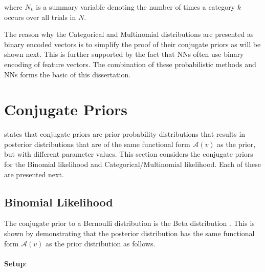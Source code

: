 where $N_{k}$ is a summary variable denoting the number of times a category $k$ occurs over all trials in $N$.

The reason why the Categorical and Multinomial distributions are presented as binary encoded vectors is to simplify the proof of their conjugate priors as will be shown next. This is further supported by the fact that \acp{NN} often use binary encoding of feature vectors. The combination of these probabilistic methods and \acp{NN} forms the basic of this dissertation.


\section{Conjugate Priors}
\label{sec:probability:conjugate_priors}

\citeauthor{ref:wackerly:2014}\cite{ref:wackerly:2014} states that conjugate priors are prior probability distributions that results in posterior distributions that are of the same functional form $\mathcal{A}(v)$ as the prior, but with different parameter values. This section considers the conjugate priors for the Binomial likelihood and Categorical/Multinomial likelihood. Each of these are presented next.

\subsection{Binomial Likelihood}
\label{sec:probability:conjugate_priors:binom_likelihood}

The conjugate prior to a Bernoulli distribution is the Beta distribution
\cite{ref:wackerly:2014}. This is shown by demonstrating that the posterior distribution has the
same functional form $\mathcal{A}(v)$ as the prior distribution as follows. \\\\
\textbf{Setup}:

